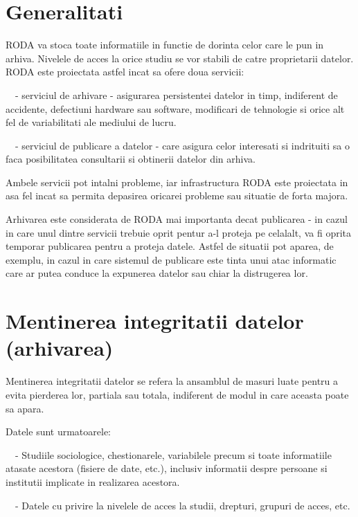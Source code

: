 \section{Generalitati}

RODA va stoca toate informatiile in functie de dorinta celor care le pun in arhiva. Nivelele de acces la orice studiu se
vor stabili de catre proprietarii datelor. RODA este proiectata astfel incat sa ofere doua servicii:

{\sffamily\color{black}
\ \ {}- serviciul de arhivare - asigurarea persistentei datelor in timp, indiferent de accidente, defectiuni hardware
sau software, modificari de tehnologie si orice alt fel de variabilitati ale mediului de lucru.}

{\sffamily\color{black}
\ \ {}- serviciul de publicare a datelor - care asigura celor interesati si indrituiti sa o faca posibilitatea
consultarii si obtinerii datelor din arhiva. }

Ambele servicii pot intalni probleme, iar infrastructura RODA este proiectata in asa fel incat sa permita depasirea
oricarei probleme sau situatie de forta majora.

Arhivarea este considerata de RODA mai importanta decat publicarea - in cazul in care unul dintre servicii trebuie oprit
pentur a-l proteja pe celalalt, va fi oprita temporar publicarea pentru a proteja datele. Astfel de situatii pot
aparea, de exemplu, in cazul in care sistemul de publicare este tinta unui atac informatic care ar putea conduce la
expunerea datelor sau chiar la distrugerea lor.

\section{Mentinerea integritatii datelor (arhivarea)}

Mentinerea integritatii datelor se refera la ansamblul de masuri luate pentru a evita pierderea lor, partiala sau
totala, indiferent de modul in care aceasta poate sa apara. 

Datele sunt urmatoarele:

{\sffamily\color{black}
\ \ {}- Studiile sociologice, chestionarele, variabilele precum si toate informatiile atasate acestora (fisiere de date,
etc.), inclusiv informatii despre persoane si institutii implicate in realizarea acestora.}

{\sffamily\color{black}
\ \ {}- Datele cu privire la nivelele de acces la studii, drepturi, grupuri de acces, etc.}


